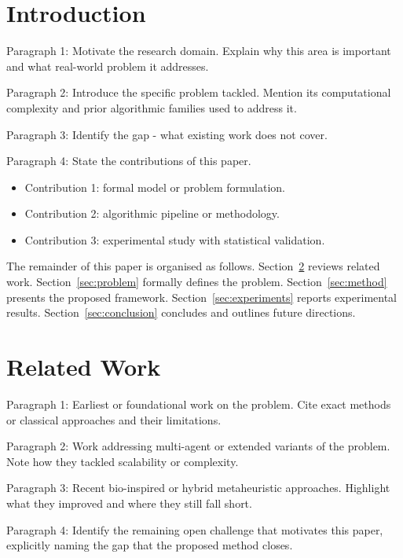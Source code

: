\documentclass[a4paper,fleqn]{cas-dc}
\begin{document}
\maketitle

\section{Introduction}\label{sec:intro}

Paragraph 1: Motivate the research domain. Explain why this area is important and what real-world problem it addresses.

Paragraph 2: Introduce the specific problem tackled. Mention its computational complexity and prior algorithmic families used to address it.

Paragraph 3: Identify the gap - what existing work does not cover.

Paragraph 4: State the contributions of this paper.
\begin{itemize}
  \item Contribution 1: formal model or problem formulation.
  \item Contribution 2: algorithmic pipeline or methodology.
  \item Contribution 3: experimental study with statistical validation.
\end{itemize}

The remainder of this paper is organised as follows.
Section~\ref{sec:related} reviews related work.
Section~\ref{sec:problem} formally defines the problem.
Section~\ref{sec:method} presents the proposed framework.
Section~\ref{sec:experiments} reports experimental results.
Section~\ref{sec:conclusion} concludes and outlines future directions.

\section{Related Work}\label{sec:related}

Paragraph 1: Earliest or foundational work on the problem. Cite exact methods or classical approaches and their limitations.

Paragraph 2: Work addressing multi-agent or extended variants of the problem. Note how they tackled scalability or complexity.

Paragraph 3: Recent bio-inspired or hybrid metaheuristic approaches. Highlight what they improved and where they still fall short.

Paragraph 4: Identify the remaining open challenge that motivates this paper, explicitly naming the gap that the proposed method closes.
\end{document}
